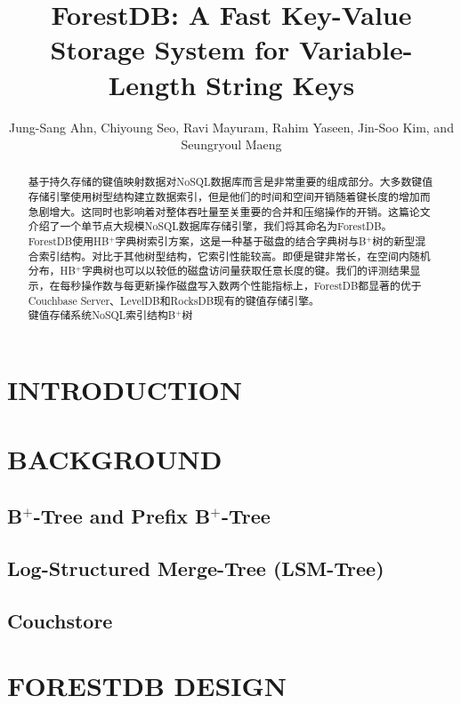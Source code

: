 \documentclass[lang=cn]{cls/elegantpaper}
\title{ForestDB: A Fast Key-Value Storage System for Variable-Length String Keys}
\author{Jung-Sang Ahn, Chiyoung Seo, Ravi Mayuram, Rahim Yaseen, Jin-Soo Kim, and Seungryoul Maeng}
\begin{document}
\maketitle

\begin{abstract}
\noindent \sffamily 基于持久存储的键值映射数据对NoSQL数据库而言是非常重要的组成部分。大多数键值存储引擎使用树型结构建立数据索引，但是他们的时间和空间开销随着键长度的增加而急剧增大。这同时也影响着对整体吞吐量至关重要的合并和压缩操作的开销。这篇论文介绍了一个单节点大规模NoSQL数据库存储引擎，我们将其命名为ForestDB。ForestDB使用HB$^+$字典树索引方案，这是一种基于磁盘的结合字典树与B$^+$树的新型混合索引结构。对比于其他树型结构，它索引性能较高。即便是键非常长，在空间内随机分布，HB$^+$字典树也可以以较低的磁盘访问量获取任意长度的键。我们的评测结果显示，在每秒操作数与每更新操作磁盘写入数两个性能指标上，ForestDB都显著的优于Couchbase Server、LevelDB和RocksDB现有的键值存储引擎。\\

\noindent {} 键值存储系统\quad NoSQL\quad 索引结构\quad B$^+$树
\end{abstract}

\section{INTRODUCTION}

\newpage

\section{BACKGROUND}
      
\subsection{B$^+$-Tree and Prefix B$^+$-Tree}

\subsection{Log-Structured Merge-Tree (LSM-Tree)}

\subsection{Couchstore}

\newpage

\section{FORESTDB DESIGN}
\end{document}
